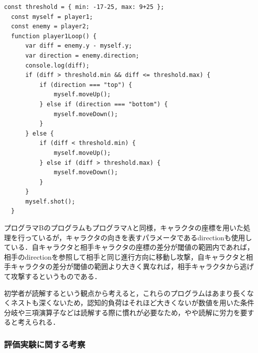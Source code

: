 \begin{lstlisting}[caption=プログラマB, label=shimizu]
  const threshold = { min: -17-25, max: 9+25 };
  const myself = player1;
  const enemy = player2;
  function player1Loop() {
      var diff = enemy.y - myself.y;
      var direction = enemy.direction;
      console.log(diff);
      if (diff > threshold.min && diff <= threshold.max) {
          if (direction === "top") {
              myself.moveUp();
          } else if (direction === "bottom") {
              myself.moveDown();
          }
      } else {
          if (diff < threshold.min) {
              myself.moveUp();
          } else if (diff > threshold.max) {
              myself.moveDown();
          }
      }
      myself.shot();
  }
\end{lstlisting}

プログラマBのプログラムもプログラマAと同様，キャラクタの座標を用いた処理を行っているが，キャラクタの向きを表すパラメータであるdirectionも使用している．自キャラクタと相手キャラクタの座標の差分が閾値の範囲内であれば，相手のdirectionを参照して相手と同じ進行方向に移動し攻撃，自キャラクタと相手キャラクタの差分が閾値の範囲より大きく異なれば，相手キャラクタから逃げて攻撃するというものである．

初学者が読解するという観点から考えると，これらのプログラムはあまり長くなくネストも深くないため，認知的負荷はそれほど大きくないが数値を用いた条件分岐や三項演算子などは読解する際に慣れが必要なため，やや読解に労力を要すると考えられる．




\subsubsection{評価実験に関する考察}

